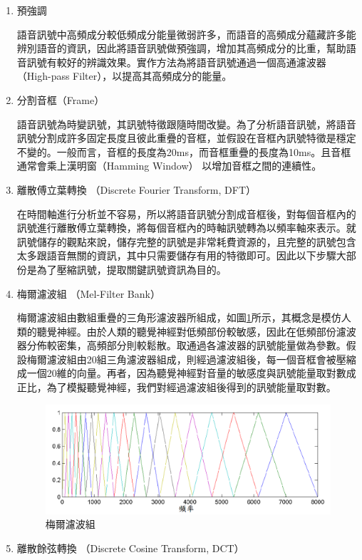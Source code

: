 \begin{enumerate}
	\item 預強調

		語音訊號中高頻成分較低頻成分能量微弱許多，而語音的高頻成分蘊藏許多能辨別語音的資訊，因此將語音訊號做預強調，增加其高頻成分的比重，幫助語音訊號有較好的辨識效果。實作方法為將語音訊號通過一個高通濾波器
		（High-pass Filter），以提高其高頻成分的能量。
	\item 分割音框（Frame）
		
		語音訊號為時變訊號，其訊號特徵跟隨時間改變。為了分析語音訊號，將語音訊號分割成許多固定長度且彼此重疊的音框，並假設在音框內訊號特徵是穩定不變的。一般而言，音框的長度為20ms，而音框重疊的長度為10ms。且音框通常會乘上漢明窗（Hamming Window） 以增加音框之間的連續性。
	\item 離散傅立葉轉換 （Discrete Fourier Transform, DFT）
		
		在時間軸進行分析並不容易，所以將語音訊號分割成音框後，對每個音框內的訊號進行離散傅立葉轉換，將每個音框內的時軸訊號轉為以頻率軸來表示。就訊號儲存的觀點來說，儲存完整的訊號是非常耗費資源的，且完整的訊號包含太多跟語音無關的資訊，其中只需要儲存有用的特徵即可。因此以下步驟大部份是為了壓縮訊號，提取關鍵訊號資訊為目的。
	\item 梅爾濾波組 （Mel-Filter Bank）
		
		梅爾濾波組由數組重疊的三角形濾波器所組成，如圖\ref{ch3_mel_filter}所示，其概念是模仿人類的聽覺神經。由於人類的聽覺神經對低頻部份較敏感，因此在低頻部份濾波器分佈較密集，高頻部分則較鬆散。取通過各濾波器的訊號能量做為參數。假設梅爾濾波組由20組三角濾波器組成，則經過濾波組後，每一個音框會被壓縮成一個20維的向量。再者，因為聽覺神經對音量的敏感度與訊號能量取對數成正比，為了模擬聽覺神經，我們對經過濾波組後得到的訊號能量取對數。

\begin{figure}[h]
\centering
\includegraphics[scale=0.5]{images/ch3_mel_filter.png} 
\caption{梅爾濾波組}
\label{ch3_mel_filter}
\end{figure}
	\item 離散餘弦轉換 （Discrete Cosine Transform, DCT）
		

\end{enumerate}

